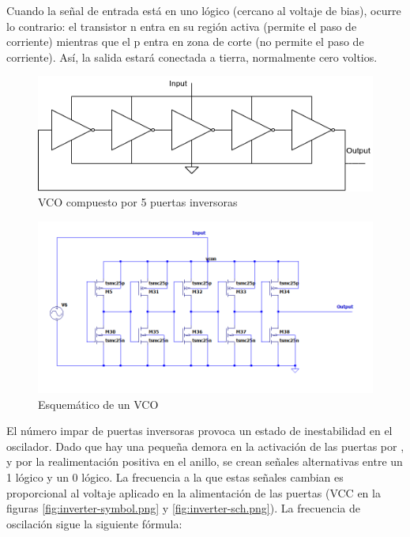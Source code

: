 \documentclass[12pt]{report} %
\begin{document}
	Cuando la señal de entrada está en uno lógico (cercano al voltaje de bias), ocurre lo contrario: el transistor n entra en su región activa (permite el paso de corriente) mientras que el p entra en zona de corte (no permite el paso de corriente). Así, la salida estará conectada a tierra, normalmente cero voltios.

	\begin{figure}[H]
		\includegraphics[width=\textwidth]{vco-symbol.png}
		\caption[VCO compuesto por 5 puertas inversoras]{VCO compuesto por 5 puertas inversoras}
		\label{fig:vco-symbol.png}
	\end{figure}

	\begin{figure}[H]
		\includegraphics[width=\textwidth]{vco-sch.png}
		\caption[Esquemático de un VCO]{Esquemático de un VCO}
		\label{fig:vco-sch.png}
	\end{figure}

	El número impar de puertas inversoras provoca un estado de inestabilidad en el oscilador. Dado que hay una pequeña demora en la activación de las puertas por %
	, y por la realimentación positiva en el anillo, se crean señales alternativas entre un 1 lógico y un 0 lógico. La frecuencia a la que estas señales cambian es proporcional al voltaje aplicado en la alimentación de las puertas (VCC en la figuras \ref{fig:inverter-symbol.png} y \ref{fig:inverter-sch.png}). La frecuencia de oscilación sigue la siguiente fórmula:
	
\end{document}
